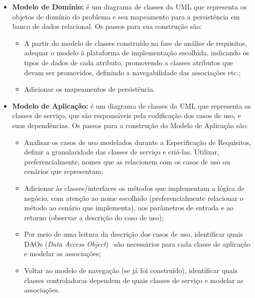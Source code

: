 \begin{itemize}
	\item \textbf{Modelo de Domínio:} é um diagrama de classes da UML que representa os objetos de domínio do problema e seu mapeamento para a persistência em banco de dados relacional. Os passos para sua construção são:
	
	\begin{itemize}
		\item A partir do modelo de classes construído na fase de análise de requisitos, adequar o modelo à plataforma de implementação escolhida, indicando os tipos de dados de cada atributo, promovendo a classes atributos que devam ser promovidos, definindo a navegabilidade das associações etc.;
		\item Adicionar os mapeamentos de persistência.	
		
	\end{itemize}
	
	\item \textbf{Modelo de Aplicação:} é um diagrama de classes da UML que representa as classes de serviço, que são responsáveis pela codificação dos casos de uso, e suas dependências. Os passos para a construção do Modelo de Aplicação são:	
	\begin{itemize}
		\item Analisar os casos de uso modelados durante a Especificação de Requisitos, definir a granularidade das classes de serviço e criá-las. Utilizar, preferencialmente, nomes que as relacionem com os casos de uso ou cenários que representam;
		
		\item Adicionar às classes/interfaces os métodos que implementam a lógica de negócio, com atenção ao nome escolhido (preferencialmente relacionar o método ao cenário que implementa), aos parâmetros de entrada e ao retorno (observar a descrição do caso de uso);
		
		\item Por meio de uma leitura da descrição dos casos de uso, identificar quais DAOs (\textit{Data Access Object})~\cite{alurDAO} são necessários para cada classe de aplicação e modelar as associações;
		
		\item Voltar ao modelo de navegação (se já foi construído), identificar quais classes controladoras dependem de quais classes de serviço e modelar as associações.
	\end{itemize}
	

\end{itemize}
